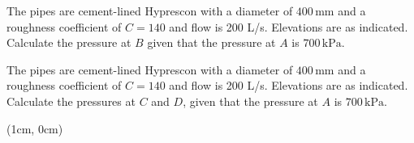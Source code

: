 \documentclass[9pt,xcolor={svgnames, x11names},mathpazo, professionalfonts]{beamer}
\begin{document}
\begin{frame}
	\vspace{-0.75cm}
	\vspace{-1cm}
	\centering
	\begin{myexam}[width=0.8\textwidth]{}{}
		\raggedright
		The pipes are cement-lined Hyprescon with a diameter of $400\,\text{mm}$ and a roughness coefficient of $C=140$ and flow is 200 L/s.
		Elevations are as indicated.
		\parm
		Calculate the pressure at $B$ given that the pressure at $A$ is $700\,\text{kPa}$.
	\end{myexam}
	
	
\end{frame}


\begin{frame}
	\vspace{-0.75cm}
	\vspace{-1cm}
	\centering
	\begin{myexer}[width=0.8\textwidth]{}{}
		\raggedright
		The pipes are cement-lined Hyprescon with a diameter of $400\,\text{mm}$ and a roughness coefficient of $C=140$ and flow is 200 L/s.
		Elevations are as indicated.
		\parm
		Calculate the pressures at $C$ and $D$, given that the
		pressure at $A$ is $700\,\text{kPa}$.
	\end{myexer}
	
	
\end{frame}



\begin{frame}
	\begin{textblock*}{0.5\columnwidth}(1cm, 0cm)
	\end{textblock*}
	
	\vspace{3.5cm}
	
\end{frame}
\end{document}
